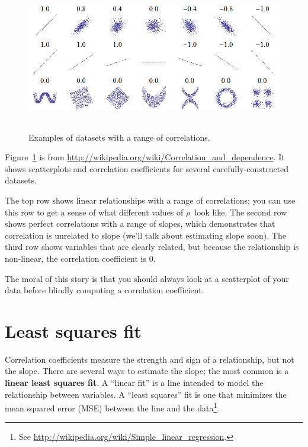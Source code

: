 \begin{figure}
\centerline{\includegraphics[height=2.5in]{statistics/Correlation_examples.png}}
\caption{Examples of datasets with a range of correlations.}
\label{corr_examples}
\end{figure}

Figure~\ref{corr_examples} is from
\url{http://wikipedia.org/wiki/Correlation_and_dependence}.  It shows
scatterplots and correlation coefficients for several
carefully-constructed datasets.

The top row shows linear relationships with a range of correlations;
you can use this row to get a sense of what different values of
$\rho$~look like.  The second row shows perfect correlations with a
range of slopes, which demonstrates that correlation is unrelated to
slope (we'll talk about estimating slope soon).  The third row shows
variables that are clearly related, but because the relationship is
non-linear, the correlation coefficient is 0.

The moral of this story is that you should always look at a scatterplot of
your data before blindly computing a correlation coefficient.

\section{Least squares fit}

Correlation coefficients measure the strength and sign of a
relationship, but not the slope.  There are several ways to estimate
the slope; the most common is a {\bf linear least squares fit}.  A
``linear fit'' is a line intended to model the relationship between
variables.  A ``least squares'' fit is one that minimizes the mean
squared error (MSE) between the line and the data\footnote{See
  \url{http://wikipedia.org/wiki/Simple_linear_regression}.}.

